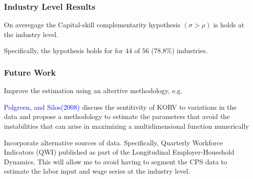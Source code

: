 \documentclass[notes,11pt, aspectratio=169]{beamer}
\newenvironment{wideitemize}{\itemize\addtolength{\itemsep}{10pt}}{\enditemize}
\begin{document}
\begin{frame}
  \frametitle{Industry Level Results}
  \begin{wideitemize}
    \item On averegage the Capital-skill complementarity hypothesis $(\sigma > \rho)$ is holds at the industry level.
    \item Specifically, the hypothesis holds for for $44$ of $56$ ($78.8\%$) industries.
  \end{wideitemize}
 \end{frame}

\begin{frame}
  \frametitle{Future Work}

  \begin{wideitemize}
    
    
    \item Improve the estimation using an altertive methodology, e.g. 
    \begin{wideitemize}
      \item \textcolor{blue}{Polgreen, and Silos(2008)} discuss the sentitivity of KORV to variations in the data and propose a methodology to estimate the parameters that avoid the instabilities that can arise in maximizing a multidimensional function numerically
    \end{wideitemize}
      
    \item Incorporate alternative sources of data. Specifically, Quarterly Workforce Indicators (QWI) published as part of the Longitudinal Employer-Household Dynamics. This will allow me to avoid having to segment the CPS data to estimate the labor input and wage series at the industry level. 
  \end{wideitemize}

\end{frame}

\end{document}
